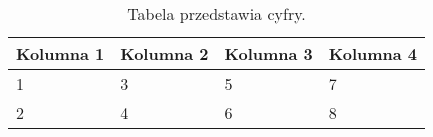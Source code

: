 \begin{table}[htbp]
\centering
\begin{tabular}{|l|l|l|l|}
\hline
Kolumna 1 & Kolumna 2 & Kolumna 3 & Kolumna 4 \\ \hline
1         & 3         & 5         & 7         \\ \hline
2         & 4         & 6         & 8         \\ \hline
\end{tabular}
\label{tab:piotr_tabela}
\caption{Tabela przedstawia cyfry.}
\end{table}